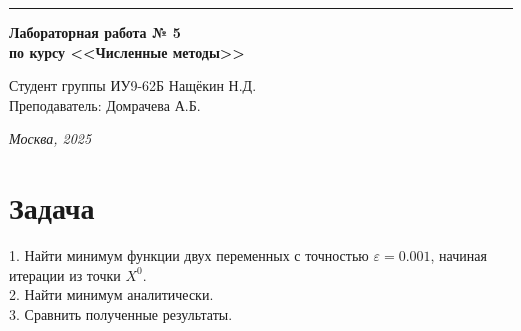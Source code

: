 \documentclass[a4paper, 14pt]{extarticle}
\begin{document}
\begin{titlepage}
\vspace*{-16pt}
\hspace{30pt}\rule{0.866\textwidth}{0.4pt}
  
\vspace{11em}

\begin{center}
\Large {\bf Лабораторная работа № 5} \\ 
\large {\bf по курсу <<Численные методы>>} \\ 
\end{center}\normalsize

\vspace{8em}


\begin{flushright}
  {Студент группы ИУ9-62Б Нащёкин Н.Д.\hspace*{15pt} \\
  \vspace{2ex}
  Преподаватель: Домрачева А.Б.\hspace*{15pt}}
\end{flushright}

\bigskip

\vfill
 

\begin{center}
\textsl{Москва, 2025}
\end{center}
\end{titlepage}

\renewcommand{\ttdefault}{pcr}

\setlength{\tabcolsep}{3pt}
\newpage
\setcounter{page}{2}

\section{Задача}
\begin{justify}
1. Найти минимум функции двух переменных с точностью $\varepsilon = 0.001$, начиная 
итерации из точки $X^0$. \\
2. Найти минимум аналитически.\\
3. Сравнить полученные результаты.  


\end{justify}
\pagebreak
\end{document}
